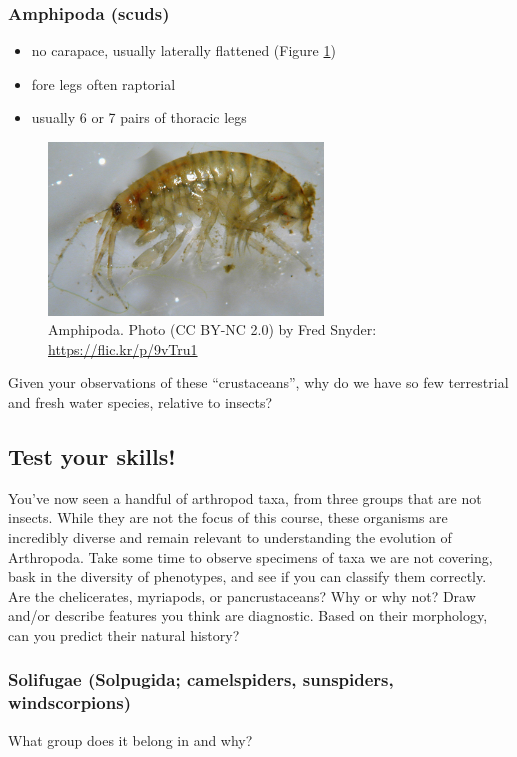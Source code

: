 \documentclass[letterpaper, 11pt]{article}
\begin{document}
\subsubsection*{Amphipoda (scuds)}
\begin{itemize}
\item no carapace, usually laterally flattened (Figure \ref{fig:amphip})
\item fore legs often raptorial
\item usually 6 or 7 pairs of thoracic legs
\end{itemize}

\begin{figure}[ht!]
  \centering
    \includegraphics[width=0.65\textwidth]{amphip}
  \caption{Amphipoda. Photo (CC BY-NC 2.0) by Fred Snyder:  \url{https://flic.kr/p/9vTru1}}
  \label{fig:amphip}
\end{figure}

\noindent{}Given your observations of these ``crustaceans'', why do we have so few terrestrial and fresh water species, relative to insects? \vspace{3cm}

\subsection{Test your skills!}
You've now seen a handful of arthropod taxa, from three groups that are not insects. While they are not the focus of this course, these organisms are incredibly diverse and remain relevant to understanding the evolution of Arthropoda. Take some time to observe specimens of taxa we are not covering, bask in the diversity of phenotypes, and see if you can classify them correctly. Are the chelicerates, myriapods, or pancrustaceans? Why or why not? Draw and/or describe features you think are diagnostic. Based on their morphology, can you predict their natural history?

\subsubsection*{Solifugae (Solpugida; camelspiders, sunspiders, windscorpions)}
What group does it belong in and why?\vspace{1cm}
\end{document}
